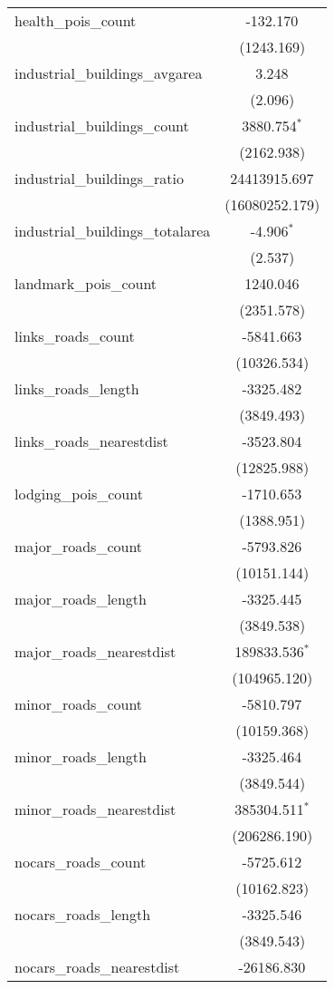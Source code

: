 \begin{table}[!htbp]
\begin{tabular}{@{\extracolsep{5pt}}lc}
 health_pois_count & -132.170$^{}$ \\
  & (1243.169) \\
 industrial_buildings_avgarea & 3.248$^{}$ \\
  & (2.096) \\
 industrial_buildings_count & 3880.754$^{*}$ \\
  & (2162.938) \\
 industrial_buildings_ratio & 24413915.697$^{}$ \\
  & (16080252.179) \\
 industrial_buildings_totalarea & -4.906$^{*}$ \\
  & (2.537) \\
 landmark_pois_count & 1240.046$^{}$ \\
  & (2351.578) \\
 links_roads_count & -5841.663$^{}$ \\
  & (10326.534) \\
 links_roads_length & -3325.482$^{}$ \\
  & (3849.493) \\
 links_roads_nearestdist & -3523.804$^{}$ \\
  & (12825.988) \\
 lodging_pois_count & -1710.653$^{}$ \\
  & (1388.951) \\
 major_roads_count & -5793.826$^{}$ \\
  & (10151.144) \\
 major_roads_length & -3325.445$^{}$ \\
  & (3849.538) \\
 major_roads_nearestdist & 189833.536$^{*}$ \\
  & (104965.120) \\
 minor_roads_count & -5810.797$^{}$ \\
  & (10159.368) \\
 minor_roads_length & -3325.464$^{}$ \\
  & (3849.544) \\
 minor_roads_nearestdist & 385304.511$^{*}$ \\
  & (206286.190) \\
 nocars_roads_count & -5725.612$^{}$ \\
  & (10162.823) \\
 nocars_roads_length & -3325.546$^{}$ \\
  & (3849.543) \\
 nocars_roads_nearestdist & -26186.830$^{}$ \\

\end{tabular}
\end{table}
